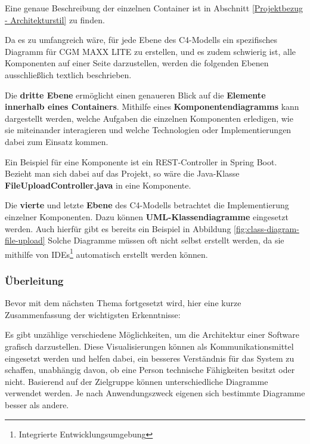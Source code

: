     Eine genaue Beschreibung der einzelnen Container ist in Abschnitt \ref{Projektbezug - Architekturstil} zu finden.

    Da es zu umfangreich wäre, für jede Ebene des C4-Modells ein spezifisches Diagramm für CGM MAXX LITE zu erstellen, und es zudem schwierig ist, alle Komponenten auf einer Seite darzustellen, werden die folgenden Ebenen ausschließlich textlich beschrieben.

    Die \textbf{dritte Ebene} ermöglicht einen genaueren Blick auf die \textbf{Elemente innerhalb eines Containers}.
    Mithilfe eines \textbf{Komponentendiagramms} kann dargestellt werden, welche Aufgaben die einzelnen Komponenten erledigen, wie sie miteinander interagieren und welche Technologien oder Implementierungen dabei zum Einsatz kommen.
    \cite{EA:Web27, EA:Web28}

    Ein Beispiel für eine Komponente ist ein REST-Controller in Spring Boot. Bezieht man sich dabei auf das Projekt, so wäre die Java-Klasse \textbf{FileUploadController.java} in  eine Komponente.

    Die \textbf{vierte} und letzte \textbf{Ebene} des C4-Modells betrachtet die Implementierung einzelner Komponenten.
    Dazu können \textbf{UML-Klassendiagramme} eingesetzt werden. Auch hierfür gibt es bereits ein Beispiel in Abbildung \ref{fig:class-diagram-file-upload}
    Solche Diagramme müssen oft nicht selbst erstellt werden, da sie mithilfe von IDEs\footnote{Integrierte Entwicklungsumgebung} automatisch erstellt werden können.
    \cite{EA:Web28}

    \clearpage

    \subsubsection{Überleitung}
    
    Bevor mit dem nächsten Thema fortgesetzt wird, hier eine kurze Zusammenfassung der wichtigsten Erkenntnisse:
    
    Es gibt unzählige verschiedene Möglichkeiten, um die Architektur einer Software grafisch darzustellen. 
    Diese Visualisierungen können als Kommunikationsmittel eingesetzt werden und helfen dabei, ein besseres Verständnis für das System zu schaffen, unabhängig davon, ob eine Person technische Fähigkeiten besitzt oder nicht. 
    Basierend auf der Zielgruppe können unterschiedliche Diagramme verwendet werden.    
    Je nach Anwendungszweck eigenen sich bestimmte Diagramme besser als andere.
    

